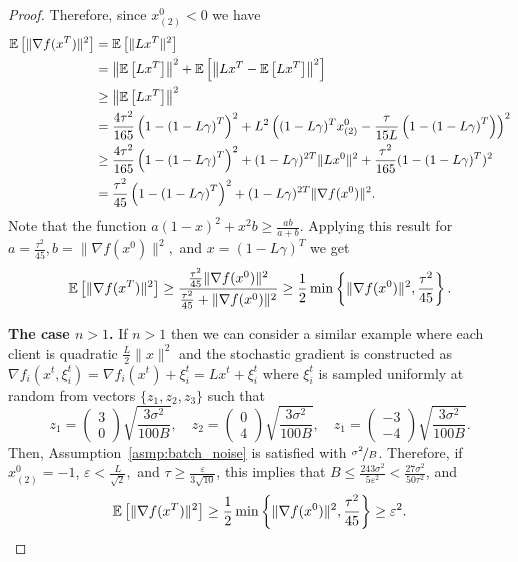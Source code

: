 \documentclass[a4paper,11pt]{article}
\begin{document}
\begin{proof}
    
    Therefore, since $x_{(2)}^0 < 0$ we have 
    \begin{align*}
        \mathbb{E}\left[\|\nabla f(x^T)\|^2\right] &= \mathbb{E}\left[\|Lx^T\|^2\right]\\
        &= \left\|\mathbb{E}\left[Lx^T\right]\right\|^2
        + \mathbb{E}\left[\left\|Lx^T - \mathbb{E}\left[Lx^T\right]\right\|^2\right]\\
        &\ge \left\|\mathbb{E}\left[Lx^T\right]\right\|^2\\
        &= \frac{4\tau^2}{165}\left(1-\left(1-L\gamma\right)^T\right)^2 
        + L^2\left((1-L\gamma)^Tx^0_{(2)} - \frac{\tau}{15L}\left(1-\left(1-L\gamma\right)^T\right)\right)^2\\
        &\ge \frac{4\tau^2}{165}\left(1-\left(1-L\gamma\right)^T\right)^2 
        + (1-L\gamma)^{2T}\|Lx^0\|^2 
        + \frac{\tau^2}{165}(1-(1-L\gamma)^T)^2\\
        &= \frac{\tau^2}{45}\left(1-\left(1-L\gamma\right)^T\right)^2 
        + (1-L\gamma)^{2T}\|\nabla f(x^0)\|^2.
    \end{align*}
    Note that the function $a(1-x)^2 + x^2b \ge \frac{ab}{a+b}.$ Applying this result for $a = \frac{\tau^2}{45}, b = \|\nabla f(x^0)\|^2,$ and $x = (1-L\gamma)^T$ we get
    \begin{align*}
        \mathbb{E}\left[\|\nabla f(x^T)\|^2\right] \ge 
        \frac{\frac{\tau^2}{45}\|\nabla f(x^0)\|^2}{\frac{\tau^2}{45}+ \|\nabla f(x^0)\|^2} 
        \ge 
        \frac{1}{2}\min\left\{\|\nabla f(x^0)\|^2, \frac{\tau^2}{45}\right\}.
    \end{align*}
    
    {\bf The case $n>1$.} If $n > 1$ then we can consider a similar example where each client is quadratic $\frac{L}{2}\|x\|^2$ and the stochastic gradient is constructed as $\nabla f_i(x^t,\xi^t_i) = \nabla f_i(x^t) + \xi^t_i = Lx^t + \xi^t_i$ where $\xi^t_i$ is sampled uniformly at random from vectors $\{z_1,z_2,z_3\}$ such that
    \[
    z_1 = \begin{pmatrix}
        3 \\ 0
    \end{pmatrix}\sqrt{\frac{3\sigma^2}{100B}}, \quad 
    z_2 = \begin{pmatrix}
        0 \\ 4
    \end{pmatrix}\sqrt{\frac{3\sigma^2}{100B}}, \quad 
    z_1 = \begin{pmatrix}
        -3 \\ -4
    \end{pmatrix}\sqrt{\frac{3\sigma^2}{100B}}.
    \]
    Then, Assumption~\ref{asmp:batch_noise} is satisfied with $\nicefrac{\sigma^2}{B}$. Therefore, if $x_{(2)}^0 = -1$, $\varepsilon < \frac{L}{\sqrt{2}},$ and $\tau \ge \frac{\varepsilon}{3\sqrt{10}}$, this implies that $B \le \frac{243\sigma^2}{5\varepsilon^2} < \frac{27\sigma^2}{50\tau^2}$, and 
    \begin{align*}
        \mathbb{E}\left[\|\nabla f(x^T)\|^2\right] \ge
        \frac{1}{2}\min\left\{\|\nabla f(x^0)\|^2, \frac{\tau^2}{45}\right\} \ge \varepsilon^2.
    \end{align*}
\end{proof}
\end{document}
